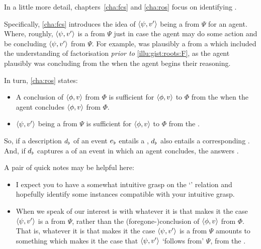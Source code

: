 \begin{note}
  In a little more detail, chapters~\ref{cha:fcs} and \ref{cha:ros} focus on identifying \fingfr{}.

  Specifically, \autoref{cha:fcs} introduces the idea of \(\langle\psi, v'\rangle\) being a \fc{} from \(\Psi\) for an agent.
  Where, roughly, \(\langle\psi, v'\rangle\) is a  from \(\Psi\) just in case the agent may do some action and be concluding \(\langle\psi, v'\rangle\) from \(\Psi\).
  For example,  was plausibly a \fc{} from a \pool{} which included the \agents{} understanding of factorisation \emph{prior to} \autoref{illu:gist:roots:F}, as the agent plausibly was concluding  from the \pool{} when the agent begins their reasoning.

  In turn, \autoref{cha:ros} states:
  \begin{itemize}
  \item
    A conclusion of \(\langle\phi, v\rangle\) from \(\Phi\) is sufficient for \(\langle\phi, v\rangle\) to \fof{} \(\Phi\) from the \agpe{} when the agent concludes \(\langle\phi, v\rangle\) from \(\Phi\).
  \item
    \(\langle\psi, v'\rangle\) being a \fc{} from \(\Psi\) is sufficient for \(\langle\phi, v\rangle\) to \fof{} \(\Phi\) from the \agpe{}.
  \end{itemize}
  So, if a description \(d\sb{\flat}\) of an event \(e\sb{\flat}\) entails a , \(d\sb{\flat}\) also entails a corresponding \fingfr{}.
  And, if \(d\sb{\flat}\) captures a \se{} of an event in which an agent concludes, the \fingfr{} answers \qWhy{}.

  A pair of quick notes may be helpful here:

  \begin{itemize}
  \item
    I expect you to have a somewhat intuitive grasp on the `\fof{}' relation and  hopefully identify some instances compatible with your intuitive grasp.
  \item
    When we speak of  our interest is with whatever it is that makes it the case \(\langle\psi, v'\rangle\) is a \fc{} from \(\Psi\), rather than the (foregone-)conclusion of \(\langle\phi, v\rangle\) from \(\Phi\).
    That is, whatever it is that makes it the case \(\langle\psi, v'\rangle\) is a \fc{} from \(\Psi\) amounts to something which makes it the case that \(\langle\psi, v'\rangle\) `follows from' \(\Psi\), from the \agpe{}.
  \end{itemize}
\end{note}


